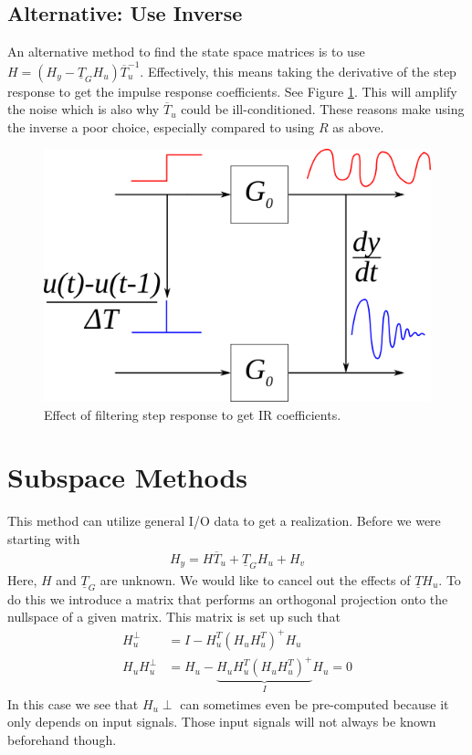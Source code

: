 \subsection{Alternative: Use Inverse}
An alternative method to find the state space matrices is to use $H=(H_y-\underline{T}_GH_u)\overline{T}_u^{-1}$. Effectively, this means taking the derivative of the step response to get the impulse response coefficients. See Figure \ref{fig:11filter}. This will amplify the noise which is also why $\overline{T}_u$ could be ill-conditioned. These reasons make using the inverse a poor choice, especially compared to using $R$ as above.

\begin{figure}[ht!]
	\centering
	\includegraphics[width=.5\textwidth]{images/11filter}
	\caption{Effect of filtering step response to get IR coefficients.}
	\label{fig:11filter}
\end{figure}

\section{Subspace Methods}
This method can utilize general I/O data to get a realization. Before we were starting with
\begin{align}
\label{eq:hy}
H_y=H\overline{T}_u+\underline{T}_GH_u+H_v
\end{align}
Here, $H$ and $\underline{T}_G$ are unknown. We would like to cancel out the effects of $\underline{T}H_u$. To do this we introduce a matrix that performs an orthogonal projection onto the nullspace of a given matrix. This matrix is set up such that
\begin{align*}
H_u^\perp &= I-H_u^T(H_uH_u^T)^+H_u \\
H_uH_u^\perp &= H_u - \underbrace{H_uH_u^T(H_uH_u^T)^+}_{I}H_u = 0
\end{align*}
In this case we see that $H_u\perp$ can sometimes even be pre-computed because it only depends on input signals. Those input signals will not always be known beforehand though.

